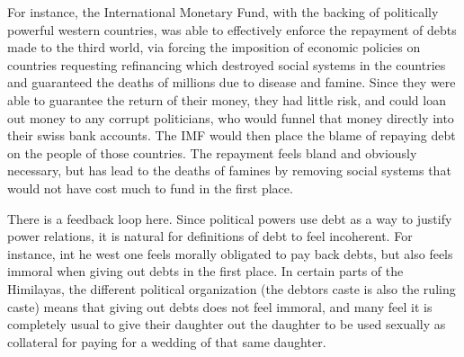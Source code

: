 For instance, the International Monetary Fund, with the backing of politically powerful western countries, was able to effectively enforce the repayment of debts made to the third world, via forcing the imposition of economic policies on countries requesting refinancing which destroyed social systems in the countries and guaranteed the deaths of millions due to disease and famine. Since they were able to guarantee the return of their money, they had little risk, and could loan out money to any corrupt politicians, who would funnel that money directly into their swiss bank accounts. The IMF would then place the blame of repaying debt on the people of those countries. The repayment feels bland and obviously necessary, but has lead to the deaths of famines by removing social systems that would not have cost much to fund in the first place.

There is a feedback loop here. Since political powers use debt as a way to justify power relations, it is natural for definitions of debt to feel incoherent. For instance, int he west one feels morally obligated to pay back debts, but also feels immoral when giving out debts in the first place. In certain parts of the Himilayas, the different political organization (the debtors caste is also the ruling caste) means that giving out debts does not feel immoral, and many feel it is completely usual to give their daughter out the daughter to be used sexually as collateral for paying for a wedding of that same daughter.

